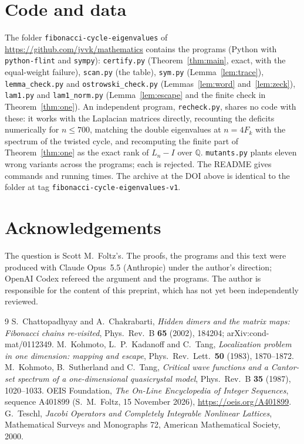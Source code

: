 \documentclass[11pt]{amsart}
\theoremstyle{definition}
\newcommand{\Q}{\mathbb{Q}}
\begin{document}
\section*{Code and data}
The folder \texttt{fibonacci-cycle-eigenvalues} of \url{https://github.com/jvvk/mathematics} contains the
programs (Python with \texttt{python-flint} and \texttt{sympy}): \texttt{certify.py} (Theorem~\ref{thm:main},
exact, with the equal-weight failure), \texttt{scan.py} (the table), \texttt{sym.py} (Lemma~\ref{lem:trace}),
\texttt{lemma\_check.py} and \texttt{ostrowski\_check.py} (Lemmas~\ref{lem:word} and~\ref{lem:zeck}),
\texttt{lam1.py} and \texttt{lam1\_norm.py} (Lemma~\ref{lem:escape} and the finite check in
Theorem~\ref{thm:one}). An independent program, \texttt{recheck.py}, shares no code with these: it works with the
Laplacian matrices directly, recounting the deficits numerically for $n\le700$, matching the double eigenvalues
at $n=4F_k$ with the spectrum of the twisted cycle, and recomputing the finite part of Theorem~\ref{thm:one} as the
exact rank of $L_n-I$ over $\Q$. \texttt{mutants.py} plants eleven wrong variants across the programs; each is
rejected. The README gives commands and running times. The archive at the DOI above is identical to the folder at
tag \texttt{fibonacci-cycle-eigenvalues-v1}.

\section*{Acknowledgements}
The question is Scott M.~Foltz's. The proofs, the programs and this text were produced with Claude Opus~5.5
(Anthropic) under the author's direction; OpenAI Codex refereed the argument and the programs. The author is
responsible for the content of this preprint, which has not yet been independently reviewed.

\begin{thebibliography}{9}
 S.~Chattopadhyay and A.~Chakrabarti, \emph{Hidden dimers and the matrix maps: Fibonacci chains
re-visited}, Phys.\ Rev.\ B \textbf{65} (2002), 184204; arXiv:cond-mat/0112349.
 M.~Kohmoto, L.~P.~Kadanoff and C.~Tang, \emph{Localization problem in one dimension: mapping and
escape}, Phys.\ Rev.\ Lett.\ \textbf{50} (1983), 1870--1872.
 M.~Kohmoto, B.~Sutherland and C.~Tang, \emph{Critical wave functions and a Cantor-set spectrum of
a one-dimensional quasicrystal model}, Phys.\ Rev.\ B \textbf{35} (1987), 1020--1033.
 OEIS Foundation, \emph{The On-Line Encyclopedia of Integer Sequences}, sequence A401899
(S.~M.~Foltz, 15 November 2026), \url{https://oeis.org/A401899}.
 G.~Teschl, \emph{Jacobi Operators and Completely Integrable Nonlinear Lattices}, Mathematical
Surveys and Monographs 72, American Mathematical Society, 2000.
\end{thebibliography}
\end{document}
